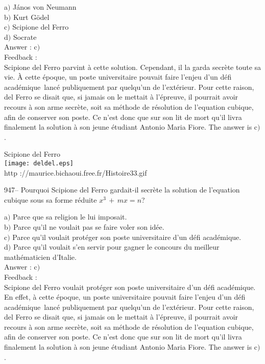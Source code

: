 ﻿\documentclass[letterpaper, 12pt]{article}
\begin{document}
a$)$ J\'anos von Neumann\\
b$)$ Kurt G\"odel  \\
c$)$ Scipione del Ferro \\
d$)$ Socrate\\

Answer : c$)$\\

Feedback : \\
Scipione del Ferro parvint \`a cette solution. Cependant, il la
garda secr\`ete toute sa vie. \`A cette \'epoque, un poste
universitaire pouvait faire l'enjeu d'un \og d\'efi acad\'emique\fg\
lanc\'e publiquement par quelqu'un de l'ext\'erieur. Pour cette
raison, del Ferro se disait que, si jamais on le mettait \`a
l'\'epreuve, il pourrait avoir recours \`a son arme secr\`ete, soit
sa m\'ethode de r\'esolution de l'equation cubique, afin de
conserver son poste. Ce n'est donc que sur son lit de mort qu'il
livra finalement la solution \`a son jeune
\'etudiant Antonio Maria Fiore. The answer is c$)$.\\

        \begin{center}
        Scipione del Ferro\\
    \texttt{[image: deldel.eps]}\\
        {\footnotesize http ://maurice.bichaoui.free.fr/Histoire33.gif}
    \end{center}

947-- Pourquoi Scipione del Ferro gardait-il secr\`ete la solution
de l'equation cubique sous sa forme r\'eduite $x^3\,+\,mx=n$?

a$)$ Parce que sa religion le lui imposait. \\
b$)$ Parce qu'il ne voulait pas se faire voler son id\'ee. \\
c$)$ Parce qu'il voulait prot\'eger son poste universitaire d'un \og
d\'efi acad\'emique\fg . \\
d$)$ Parce qu'il voulait s'en servir pour gagner le concours du meilleur
math\'ematicien d'Italie.\\

Answer : c$)$\\

Feedback :\\
Scipione del Ferro voulait prot\'eger son poste universitaire d'un
\og d\'efi acad\'emique\fg . En effet, \`a cette \'epoque, un poste
universitaire pouvait faire l'enjeu d'un \og d\'efi acad\'emique\fg\
lanc\'e publiquement par quelqu'un de l'ext\'erieur. Pour cette
raison, del Ferro se disait que, si jamais on le mettait \`a
l'\'epreuve, il pourrait avoir recours \`a son arme secr\`ete, soit
sa m\'ethode de r\'esolution de l'equation cubique, afin de
conserver son poste. Ce n'est donc que sur son lit de mort qu'il
livra finalement la solution \`a son jeune
\'etudiant Antonio Maria Fiore. The answer is c$)$.\\
\end{document}
